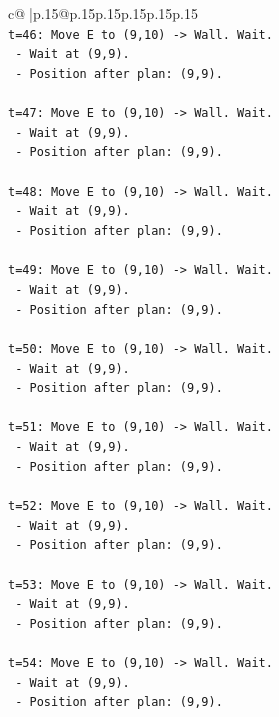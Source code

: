 \documentclass{article}
\begin{document}
{\begin{supertabular}{c@{$\;$}|p{.15\linewidth}@{}p{.15\linewidth}p{.15\linewidth}p{.15\linewidth}p{.15\linewidth}p{.15\linewidth}}
{{{\\ 
\texttt{t=46: Move E to (9,10) {-}> Wall. Wait.} \\
\texttt{   {-} Wait at (9,9).} \\
\texttt{   {-} Position after plan: (9,9).} \\
\\ 
\texttt{t=47: Move E to (9,10) {-}> Wall. Wait.} \\
\texttt{   {-} Wait at (9,9).} \\
\texttt{   {-} Position after plan: (9,9).} \\
\\ 
\texttt{t=48: Move E to (9,10) {-}> Wall. Wait.} \\
\texttt{   {-} Wait at (9,9).} \\
\texttt{   {-} Position after plan: (9,9).} \\
\\ 
\texttt{t=49: Move E to (9,10) {-}> Wall. Wait.} \\
\texttt{   {-} Wait at (9,9).} \\
\texttt{   {-} Position after plan: (9,9).} \\
\\ 
\texttt{t=50: Move E to (9,10) {-}> Wall. Wait.} \\
\texttt{   {-} Wait at (9,9).} \\
\texttt{   {-} Position after plan: (9,9).} \\
\\ 
\texttt{t=51: Move E to (9,10) {-}> Wall. Wait.} \\
\texttt{   {-} Wait at (9,9).} \\
\texttt{   {-} Position after plan: (9,9).} \\
\\ 
\texttt{t=52: Move E to (9,10) {-}> Wall. Wait.} \\
\texttt{   {-} Wait at (9,9).} \\
\texttt{   {-} Position after plan: (9,9).} \\
\\ 
\texttt{t=53: Move E to (9,10) {-}> Wall. Wait.} \\
\texttt{   {-} Wait at (9,9).} \\
\texttt{   {-} Position after plan: (9,9).} \\
\\ 
\texttt{t=54: Move E to (9,10) {-}> Wall. Wait.} \\
\texttt{   {-} Wait at (9,9).} \\
\texttt{   {-} Position after plan: (9,9).} \\
}}}
\end{supertabular}}
\end{document}
